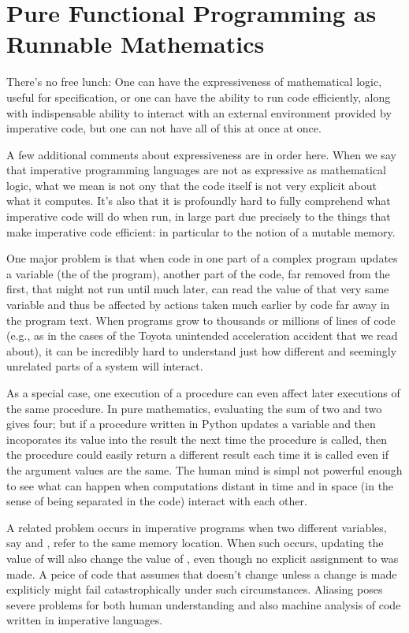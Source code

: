 \documentclass[letterpaper,10pt,english]{sphinxmanual}
\begin{document}
\section{Pure Functional Programming as Runnable Mathematics}
\label{\detokenize{02-logic-and-code:pure-functional-programming-as-runnable-mathematics}}
There’s no free lunch: One can have the expressiveness of mathematical
logic, useful for specification, or one can have the ability to run
code efficiently, along with indispensable ability to interact with an
external environment provided by imperative code, but one can not have
all of this at once at once.

A few additional comments about expressiveness are in order here. When
we say that imperative programming languages are not as expressive as
mathematical logic, what we mean is not ony that the code itself is not
very explicit about what it computes. It’s also that it is profoundly
hard to fully comprehend what imperative code will do when run, in large
part due precisely to the things that make imperative code efficient: in
particular to the notion of a mutable memory.

One major problem is that when code in one part of a complex program
updates a variable (the  of the program), another part of the
code, far removed from the first, that might not run until much later,
can read the value of that very same variable and thus be affected by
actions taken much earlier by code far away in the program text. When
programs grow to thousands or millions of lines of code (e.g., as in
the cases of the Toyota unintended acceleration accident that we read
about), it can be incredibly hard to understand just how different and
seemingly unrelated parts of a system will interact.

As a special case, one execution of a procedure can even affect later
executions of the same procedure. In pure mathematics, evaluating the
sum of two and two  gives four; but if a procedure written in
Python updates a  variable and then incoporates its value into
the result the next time the procedure is called, then the procedure
could easily return a different result each time it is called even if
the argument values are the same. The human mind is simpl not powerful
enough to see what can happen when computations distant in time and in
space (in the sense of being separated in the code) interact with each
other.

A related problem occurs in imperative programs when two different
variables, say  and , refer to the same memory location. When
such  occurs, updating the value of  will also change the
value of , even though no explicit assignment to  was made. A
peice of code that assumes that  doesn’t change unless a change is
made expliticly might fail catastrophically under such circumstances.
Aliasing poses severe problems for both human understanding and also
machine analysis of code written in imperative languages.
\end{document}
